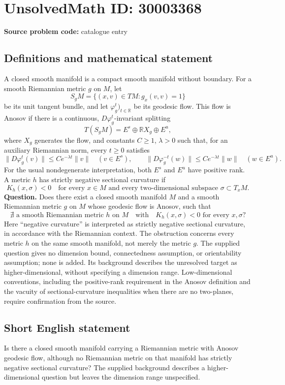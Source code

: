 \documentclass[11pt]{article}
\newcommand{\R}{\mathbb{R}}
\begin{document}
\section*{UnsolvedMath ID: 30003368}
\textbf{Source problem code:} catalogue entry
\subsection{Definitions and mathematical statement}
A closed smooth manifold is a compact smooth manifold without boundary. For a smooth Riemannian metric \(g\) on \(M\), let
\[
S_gM=\{(x,v)\in TM:g_x(v,v)=1\}
\]
be its unit tangent bundle, and let \(\varphi_g^t)_{t\in\R}\) be its geodesic flow. This flow is Anosov if there is a continuous, \(D\varphi_g^t\)-invariant splitting
\[
T(S_gM)=E^s\oplus\R X_g\oplus E^u,
\]
where \(X_g\) generates the flow, and constants \(C\geq1\), \(\lambda>0\) such that, for an auxiliary Riemannian norm, every \(t\geq0\) satisfies
\[
\|D\varphi_g^t(v)\|\leq Ce^{-\lambda t}\|v\|\quad(v\in E^s),\qquad
\|D\varphi_g^{-t}(w)\|\leq Ce^{-\lambda t}\|w\|\quad(w\in E^u).
\]
For the usual nondegenerate interpretation, both \(E^s\) and \(E^u\) have positive rank. A metric \(h\) has strictly negative sectional curvature if
\[
K_h(x,\sigma)<0
\quad\text{for every }x\in M\text{ and every two-dimensional subspace }\sigma\subset T_xM.
\]
\textbf{Question.} Does there exist a closed smooth manifold \(M\) and a smooth Riemannian metric \(g\) on \(M\) whose geodesic flow is Anosov, such that
\[
\nexists\text{ a smooth Riemannian metric }h\text{ on }M
\quad\text{with}\quad
K_h(x,\sigma)<0\text{ for every }x,\sigma?
\]
Here ``negative curvature'' is interpreted as strictly negative sectional curvature, in accordance with the Riemannian context. The obstruction concerns every metric \(h\) on the same smooth manifold, not merely the metric \(g\). The supplied question gives no dimension bound, connectedness assumption, or orientability assumption; none is added. Its background describes the unresolved target as higher-dimensional, without specifying a dimension range. Low-dimensional conventions, including the positive-rank requirement in the Anosov definition and the vacuity of sectional-curvature inequalities when there are no two-planes, require confirmation from the source.
\subsection{Short English statement}
Is there a closed smooth manifold carrying a Riemannian metric with Anosov geodesic flow, although no Riemannian metric on that manifold has strictly negative sectional curvature? The supplied background describes a higher-dimensional question but leaves the dimension range unspecified.
\end{document}
